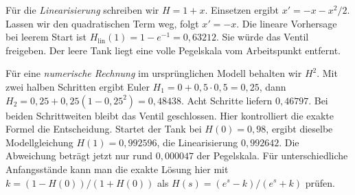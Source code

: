 Für die \emph{Linearisierung} schreiben wir \(H=1+x\). Einsetzen ergibt \(x'=-x-x^2/2\). Lassen wir den quadratischen Term weg, folgt \(x'=-x\). Die lineare Vorhersage bei leerem Start ist \(H_\mathrm{lin}(1)=1-e^{-1}=0{,}63212\). Sie würde das Ventil freigeben. Der leere Tank liegt eine volle Pegelskala vom Arbeitspunkt entfernt.

Für eine \emph{numerische Rechnung} im ursprünglichen Modell behalten wir \(H^2\). Mit zwei halben Schritten ergibt Euler \(H_1=0+0{,}5\cdot0{,}5=0{,}25\), dann \(H_2=0{,}25+0{,}25(1-0{,}25^2)=0{,}48438\). Acht Schritte liefern \(0{,}46797\). Bei beiden Schrittweiten bleibt das Ventil geschlossen. Hier kontrolliert die exakte Formel die Entscheidung.
Startet der Tank bei \(H(0)=0{,}98\), ergibt dieselbe Modellgleichung \(H(1)=0{,}992596\), die Linearisierung \(0{,}992642\). Die Abweichung beträgt jetzt nur rund \(0{,}000047\) der Pegelskala. Für unterschiedliche Anfangsstände kann man die exakte Lösung hier mit \(k=(1-H(0))/(1+H(0))\) als \(H(s)=(e^s-k)/(e^s+k)\) prüfen.

